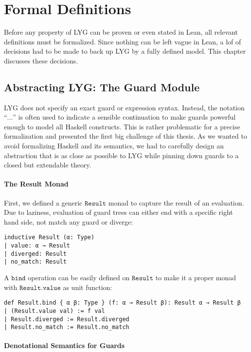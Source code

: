 \chapter{Formal Definitions}\label{sec:formalization}

Before any property of LYG can be proven or even stated in Lean, all relevant definitions must be formalized.
Since nothing can be left vague in Lean, a lof of decisions had to be made to back up LYG by a fully defined model. 
This chapter discusses these decisions.

\section{Abstracting LYG: The Guard Module}
LYG does not specify an exact guard or expression syntax.
Instead, the notation ``$...$'' is often used to indicate a sensible continuation to make guards powerful enough to model all Haskell constructs.
This is rather problematic for a precise formalization and presented the first big challenge of this thesis.
As we wanted to avoid formalizing Haskell and its semantics, we had to carefully design an abstraction that is as close as possible to LYG
while pinning down guards to a closed but extendable theory.

\subsubsection{The Result Monad}

First, we defined a generic $\mathtt{Result}$ monad to capture the result of an evaluation.
Due to laziness, evaluation of guard trees can either end with a specific right hand side, not match any guard or diverge:

\begin{verbatim}
inductive Result (α: Type)
| value: α → Result
| diverged: Result
| no_match: Result
\end{verbatim}

A $\mathtt{bind}$ operation can be easily defined on $\mathtt{Result}$ to make it a proper monad with $\mathtt{Result.value}$ as unit function:

\begin{verbatim}
def Result.bind { α β: Type } (f: α → Result β): Result α → Result β
| (Result.value val) := f val
| Result.diverged := Result.diverged
| Result.no_match := Result.no_match
\end{verbatim}

\subsubsection{Denotational Semantics for Guards}

